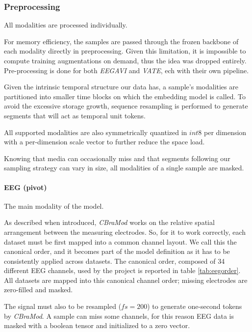 \subsubsection{Preprocessing}
All modalities are processed individually.

For memory efficiency, the samples are passed through the frozen backbone of each modality directly in preprocessing.
Given this limitation, it is impossible to compute training augmentations on demand, thus the idea was dropped entirely.
Pre-processing is done for both \textit{EEGAVI} and \textit{VATE}, ech with their own pipeline.

Given the intrinsic temporal structure our data has, a sample's modalities are partitioned into smaller time blocks on which the embedding model is called.
To avoid the excessive storage growth, sequence resampling is performed to generate segments that will act as temporal unit tokens.

All supported modalities are also symmetrically quantized in $int8$ per dimension with a per-dimension scale vector to further reduce the space load.

Knowing that media can occasionally miss and that segments following our sampling strategy can vary in size, all modalities of a single sample are masked.


\paragraph{EEG (pivot)}
The main modality of the model.

As described when introduced, \textit{CBraMod} works on the relative spatial arrangement between the measuring electrodes.
So, for it to work correctly, each dataset must be first mapped into a common channel layout.
We call this the canonical order, and it becomes part of the model definition as it has to be consistently applied across datasets.
The canonical order, composed of 34 different EEG channels, used by the project is reported in table \ref{tab:eegorder}.
All datasets are mapped into this canonical channel order; missing electrodes are zero-filled and masked.

The signal must also to be resampled ($fs=200$) to generate one-second tokens by \textit{CBraMod}.
A sample can miss some channels, for this reason EEG data is masked with a boolean tensor and initialized to a zero vector.

